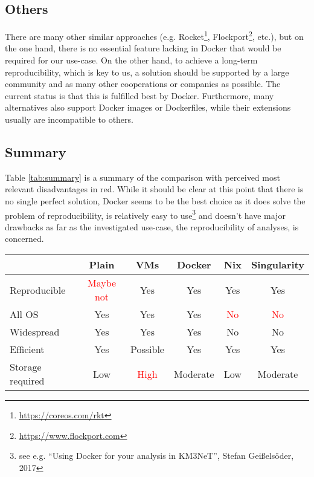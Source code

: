 \documentclass[a4paper, twoside, 11pt]{article}
\begin{document}
\subsection{Others}

There are many other similar approaches 
(e.g. Rocket\footnote{\url{https://coreos.com/rkt}}, Flockport\footnote{\url{https://www.flockport.com}}, etc.), 
but on the one hand, there is no essential feature lacking in Docker that would be required 
for our use-case. 
On the other hand, to achieve a long-term reproducibility, which is key to us, 
a solution should be supported by a large community and as many other cooperations or companies as possible. 
The current status is that this is fulfilled best by Docker. 
Furthermore, many alternatives also support Docker images or Dockerfiles, while their extensions usually are incompatible to others. 


\subsection{Summary}

Table \ref{tab:summary} is a summary of the comparison with perceived most relevant disadvantages in red.  
While it should be clear at this point that there is no single perfect solution, 
Docker seems to be the best choice as it does solve the problem of reproducibility, 
is relatively easy to use\footnote{see e.g. ``Using Docker for your analysis in KM3NeT'', Stefan Geißelsöder, 2017}
and doesn't have major drawbacks as far as the investigated use-case, the reproducibility of analyses, is concerned. 


\begin{center}
\begin{tabular}{ l | c | c | c | c | c }
\label{tab:summary}
      & Plain 	& VMs 	& Docker 	& Nix 	& Singularity \\
  \hline
  Reproducible & \textcolor{red}{Maybe not} 	& Yes 	& Yes		& Yes	& Yes \\
  \hline
  All OS & Yes 	& Yes 	& Yes		& \textcolor{red}{No}	& \textcolor{red}{No} \\
  \hline
  Widespread & Yes & Yes & Yes & No & No \\
  \hline
  Efficient & Yes & Possible & Yes & Yes & Yes \\
  \hline
  Storage required & Low & \textcolor{red}{High} & Moderate & Low & Moderate \\
\end{tabular}
\end{center}
\end{document}
